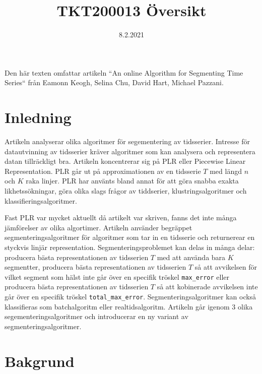 \documentclass{article}
\title{TKT200013 Översikt}
\date{8.2.2021}
\begin{document}
\maketitle

Den här texten omfattar artikeln ``An online Algorithm for Segmenting Time Series`` från Eamonn Keogh, Selina Chu, David Hart, Michael Pazzani.

\section{Inledning}

Artikeln analyserar olika algoritmer för segementering av tidsserier. Intresse för datautvinning av tidsserier kräver algoritmer som kan analysera och representera datan tillräckligt bra. Artikeln koncentrerar sig på PLR eller Piecewise Linear Representation. PLR går ut på approximationen av en tidsserie $T$ med längd $n$ och $K$ raka linjer. PLR har använts bland annat för att göra snabba exakta likhetssökningar, göra olika slags frågor av tiddserier, klustringsalgoritmer och klassifieringsalgoritmer.
\bigskip

Fast PLR var mycket aktuellt då artikelt var skriven, fanns det inte många jämförelser av olika algortimer. Artikeln använder begräppet segmenteringsalgoritmer för algoritmer som tar in en tidsserie och returnerear en styckvis linjär representation. Segmenteringsproblemet kan delas in många delar: producera bästa representationen av tidsserien $T$ med att använda bara $K$ segmentter, producera bästa representationen av tidsserien $T$ så att avvikelsen för vilket segment som hälst inte går över en specifik tröskel \texttt{max_error} eller producera bästa representationen av tidsserien $T$ så att kobinerade avvikelsen inte går över en specifik tröskel \texttt{total_max_error}. Segmenteringsalgoritmer kan också klassifieras som batchalgoritm eller realtidsalgoritm. Artikeln går igenom 3 olika segementeringsalgoritmer och introducerar en ny variant av segmenteringsalgoritmer.
\bigskip

\section{Bakgrund}
\end{document}
